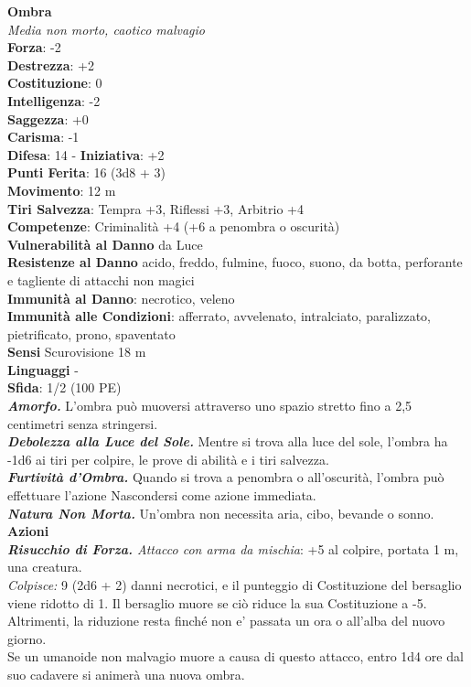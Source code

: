\begin{multicols}{2}
\medskip\textbf{Ombra}\\
\emph{Media non morto, caotico malvagio}\\
\textbf{Forza}: -2\\
\textbf{Destrezza}: +2\\
\textbf{Costituzione}: 0\\
\textbf{Intelligenza}: -2\\
\textbf{Saggezza}: +0\\
\textbf{Carisma}: -1\\
\textbf{Difesa}: 14 - \textbf{Iniziativa}: +2\\
\textbf{Punti Ferita}: 16 (3d8 + 3)\\
\textbf{Movimento}: 12 m\\
\textbf{Tiri Salvezza}: Tempra +3, Riflessi +3, Arbitrio +4\\
\textbf{Competenze}: Criminalità +4 (+6 a penombra o oscurità)\\
\textbf{Vulnerabilità al Danno} da Luce\\
\textbf{Resistenze al Danno} acido, freddo, fulmine, fuoco, suono, da botta, perforante e tagliente di attacchi non magici\\
\textbf{Immunità al Danno}: necrotico, veleno\\
\textbf{Immunità alle Condizioni}: afferrato, avvelenato, intralciato, paralizzato, pietrificato, prono, spaventato\\
\textbf{Sensi} Scurovisione 18 m\\
\textbf{Linguaggi} -\\
\textbf{Sfida}: 1/2 (100 PE)\smallskip\\
\emph{\textbf{Amorfo.}} L'ombra può muoversi attraverso uno spazio stretto fino a 2,5 centimetri senza stringersi. \\
\emph{\textbf{Debolezza alla Luce del Sole.}} Mentre si trova alla luce del sole, l'ombra ha -1d6 ai tiri per colpire, le prove di abilità e i tiri salvezza.\\
\emph{\textbf{Furtività d'Ombra.}} Quando si trova a penombra o all'oscurità, l'ombra può effettuare l'azione Nascondersi come azione immediata.\\
\emph{\textbf{Natura Non Morta.}} Un'ombra non necessita aria, cibo, bevande o sonno.\\
\smallskip\textbf{Azioni}\\
\emph{\textbf{Risucchio di Forza.} Attacco con arma da mischia}: +5 al colpire, portata 1 m, una creatura.\\
\emph{Colpisce:} 9 (2d6 + 2) danni necrotici, e il punteggio di Costituzione del bersaglio viene ridotto di 1.  Il bersaglio muore se ciò riduce la sua Costituzione a -5. Altrimenti, la riduzione resta finché non e' passata un ora o all'alba del nuovo giorno.\\
Se un umanoide non malvagio muore a causa di questo attacco, entro 1d4 ore dal suo cadavere si animerà una nuova ombra.\\


\end{multicols}
